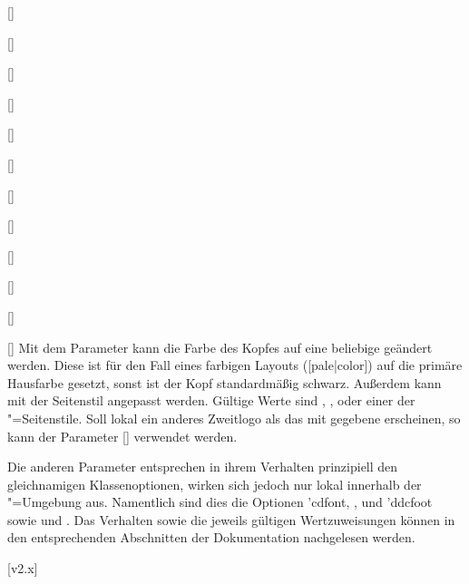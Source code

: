 \begin{Declaration}{[]}
\begin{Declaration}{[]}
\begin{Declaration}{[]}
\begin{Declaration}{[]}
\begin{Declaration}[v2.02]{[\PSet]}
\begin{Declaration}{[]}
\begin{Declaration}[v2.02]{[\PSet]}
\begin{Declaration}[v2.02]{[\PSet]}
\begin{Declaration}[v2.02]{[\PSet]}
\begin{Declaration}{[\PSet]}
\begin{Declaration}[v2.02]{[\PSet]}
\begin{Declaration}{[\PBoolean]}
Mit dem Parameter  kann die Farbe des Kopfes 
auf eine beliebige geändert werden. Diese ist für den Fall eines farbigen 
Layouts ([pale|color]) auf die primäre Hausfarbe  
gesetzt, sonst ist der Kopf standardmäßig schwarz. Außerdem kann mit
 der Seitenstil angepasst werden. 
Gültige Werte sind , ,  oder einer 
der "=Seitenstile. Soll lokal ein anderes Zweitlogo als 
das mit  gegebene erscheinen, so kann der Parameter 
[] verwendet werden.

Die anderen Parameter entsprechen in ihrem Verhalten prinzipiell den 
gleichnamigen Klassenoptionen, wirken sich jedoch nur lokal innerhalb der 
"=Umgebung aus. Namentlich sind dies die Optionen 
\Option'{cdfont}, ,  und \Option'{ddcfoot} sowie 
 und . Das Verhalten sowie die 
jeweils gültigen Wertzuweisungen können in den entsprechenden Abschnitten 
der Dokumentation nachgelesen werden.
\end{Declaration}
\end{Declaration}
\end{Declaration}
\end{Declaration}
\end{Declaration}
\end{Declaration}
\end{Declaration}
\end{Declaration}
\end{Declaration}
\end{Declaration}
\end{Declaration}
\end{Declaration}

[v2.x]


